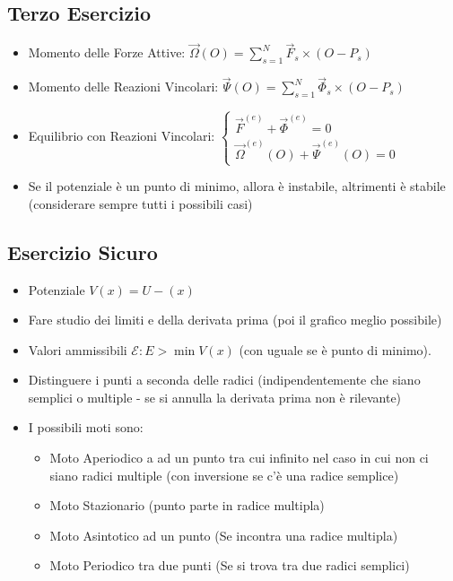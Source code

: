 \documentclass[11pt,a4paper,twoside]{article}
\theoremstyle{definition}
\begin{document}
\subsection*{Terzo Esercizio}

\begin{itemize}
	\item Momento delle Forze Attive: $\displaystyle{\vec \Omega(O) = \sum_{s=1}^N \vec F_s \times (O-P_s)}$
	\item Momento delle Reazioni Vincolari: $\displaystyle{\vec \Psi(O) = \sum_{s=1}^N \vec \Phi_s \times (O-P_s)}$
	\item Equilibrio con Reazioni Vincolari: $
		\begin{cases}
			\vec F^{(e)} + \vec \Phi^{(e)}=0\\
			\vec \Omega^{(e)}(O) + \vec \Psi^{(e)}(O)=0
		\end{cases}$
	\item Se il potenziale è un punto di minimo, allora è instabile, altrimenti è stabile (considerare sempre tutti i possibili casi)
\end{itemize}

\subsection*{Esercizio Sicuro}

\begin{itemize}
	\item Potenziale $V(x) = U-(x)$
	\item Fare studio dei limiti e della derivata prima (poi il grafico meglio possibile)
	\item Valori ammissibili $\mathscr E: E > \min V(x)$ (con uguale se è punto di minimo).
	\item Distinguere i punti a seconda delle radici (indipendentemente che siano semplici o multiple - se si annulla la derivata prima non è rilevante)
	\item I possibili moti sono:
		\begin{itemize}
			\item Moto Aperiodico a ad un punto tra cui infinito nel caso in cui non ci siano radici multiple (con inversione se c'è una radice semplice)
			\item Moto Stazionario (punto parte in radice multipla)
			\item Moto Asintotico ad un punto (Se incontra una radice multipla)
			\item Moto Periodico tra due punti (Se si trova tra due radici semplici)
		\end{itemize}
\end{itemize}
\end{document}
